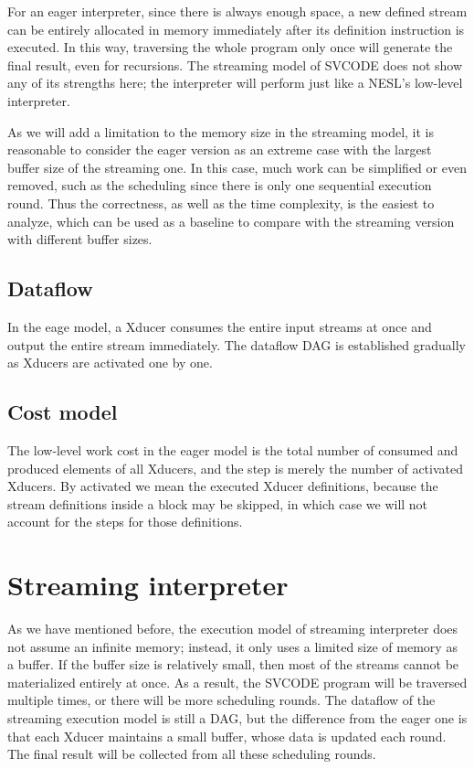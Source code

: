 For an eager interpreter, since there is always enough space, a new defined stream can be entirely allocated in memory immediately after its definition instruction is executed.
In this way, traversing the whole program only once will generate the final result, even for recursions.
The streaming model of SVCODE does not show any of its strengths here; the interpreter will perform just like a NESL's low-level interpreter. 


As we will add a limitation to the memory size in the streaming model, it is reasonable to consider the eager version as an extreme case with the largest buffer size of the streaming one. 
In this case, much work can be simplified or even removed, such as the scheduling since there is only one sequential execution round. 
Thus the correctness, as well as the time complexity, is the easiest to analyze, which can be used as a baseline to compare with the streaming version with different buffer sizes.


\subsection{Dataflow}
In the eage model, a Xducer consumes the entire input streams at once and output the entire stream immediately. 
The dataflow DAG is established gradually as Xducers are activated one by one.   

\subsection{Cost model}
The low-level work cost in the eager model is the total number of consumed and produced elements of all Xducers, and the step is merely the number of activated Xducers. 
By activated we mean the executed Xducer definitions, because the stream definitions inside a \wc block may be skipped, in which case we will not account for the steps for those definitions. 


\section{Streaming interpreter}
As we have mentioned before, the execution model of streaming interpreter does not assume an infinite memory; instead, it only uses a limited size of memory as a buffer. 
If the buffer size is relatively small, then most of the streams cannot be materialized entirely at once. 
As a result, the SVCODE program will be traversed multiple times, or there will be more scheduling rounds. 
The dataflow of the streaming execution model is still a DAG, but the difference from the eager one is that each Xducer maintains a small buffer, whose data is updated each round. 
The final result will be collected from all these scheduling rounds.


